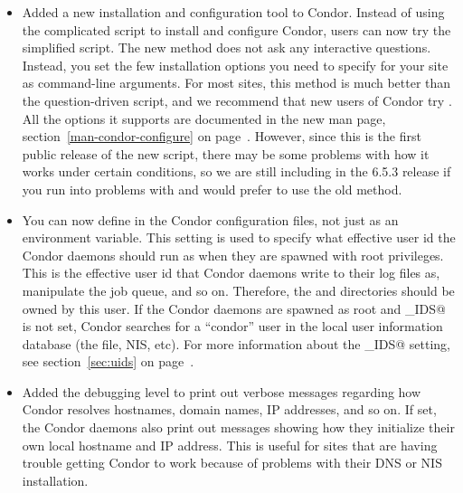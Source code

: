\begin{itemize}

\item Added a new installation and configuration tool to Condor.
  Instead of using the complicated  script to install
  and configure Condor, users can now try the simplified
   script.
  The new method does not ask any interactive questions.
  Instead, you set the few installation options you need to specify
  for your site as command-line arguments.
  For most sites, this method is much better than the question-driven
   script, and we recommend that new users of Condor
  try .
  All the options it supports are documented in the new
   man page, section~\ref{man-condor-configure} on
  page~\pageref{man-condor-configure}. 
  However, since this is the first public release of the new script,
  there may be some problems with how it works under certain
  conditions, so we are still including  in the 6.5.3 
  release if you run into problems with  and would
  prefer to use the old method. 

\item You can now define  in the Condor
  configuration files, not just as an environment variable.
  This setting is used to specify what effective user id the Condor
  daemons should run as when they are spawned with root privileges.
  This is the effective user id that Condor daemons write to their log
  files as, manipulate the job queue, and so on.
  Therefore, the  and  directories should be
  owned by this user.
  If the Condor daemons are spawned as root and \verb@CONDOR_IDS@ is
  not set, Condor searches for a ``condor'' user in the local user
  information database (the  file, NIS, etc).
  For more information about the \verb@CONDOR_IDS@ setting, see
  section~\ref{sec:uids} on page~\pageref{sec:uids}.

\item Added the  debugging level to print out verbose
  messages regarding how Condor resolves hostnames, domain names,
  IP addresses, and so on.
  If set, the Condor daemons also print out messages showing how they
  initialize their own local hostname and IP address.
  This is useful for sites that are having trouble getting Condor to
  work because of problems with their DNS or NIS installation.


\end{itemize}
